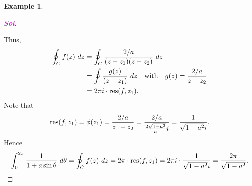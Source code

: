 \documentclass[12pt,openany]{book}
\theoremstyle{definition}
\newtheorem{example}{Example}[section]
\newcommand{\sol}{\textcolor{magenta}{\bf Sol}}
\newcommand{\res}{\textnormal{res}}
\begin{document}
\begin{example}
\begin{proof}[\sol]
\begin{center}
		\end{center}
		Thus, \begin{align*}
			\oint_C f(z)\ dz&=\oint_C\frac{2/a}{(z-z_1)(z-z_2)}\ dz\\
			&=\oint\frac{g(z)}{(z-z_1)}\ dz\quad\text{with}\quad g(z)=\frac{2/a}{z-z_2}\\
			&=2\pi i\cdot \res(f,z_1).
		\end{align*} Note that \[
		\res(f,z_1)=\phi(z_1)=\frac{2/a}{z_1-z_2}=\frac{2/a}{\frac{2\sqrt{1-a^2}}{a}i}=\frac{1}{\sqrt{1-a^2}i}.
		\] Hence \[
		\int_0^{2\pi}\frac{1}{1+a\sin\theta}\ d\theta=\oint_C f(z)\ dz= 2\pi\cdot\res(f,z_1)=2\pi i\cdot\frac{1}{\sqrt{1-a^2}i}=\frac{2\pi}{\sqrt{1-a^2}}.
		\]
		\end{proof}
	\end{example}
	
\end{document}
